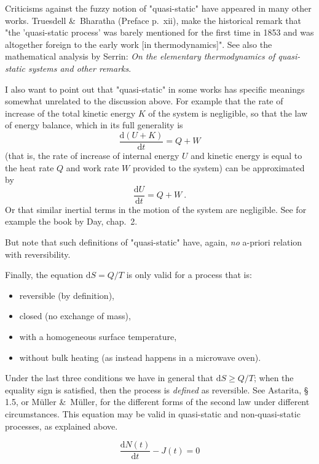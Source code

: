 \documentclass[a4paper,12pt,%
onecolumn,oneside,titlepage,%
british%
]{memoir}
\newcommand*{\amp}{\&}
\newcommand*{\di}{\mathrm{d}}%
\renewcommand*{\|}[1][]{\nonscript\:#1\vert\nonscript\:\mathopen{}}
\newcommand*{\sect}{\S}%
\newcommand*{\yN}{N}
\newcommand*{\yJ}{J}
\begin{document}
Criticisms against the fuzzy notion of "quasi-static" have appeared in many other works. Truesdell \amp\ Bharatha (Preface p.~xii), make the historical remark that "the 'quasi-static process' was barely mentioned for the first time in 1853 and was altogether foreign to the early work [in thermodynamics]". See also the mathematical analysis by Serrin: \emph{On the elementary thermodynamics of quasi-static systems and other remarks}.

\medskip

I also want to point out that "quasi-static" in some works has specific meanings somewhat unrelated to the discussion above. For example that the rate of increase of the total kinetic energy $K$ of the system is negligible, so that the law of energy balance, which in its full generality is
$$ \frac{\mathrm{d}(U+K)}{\mathrm{d}t}  = Q + W$$
(that is, the rate of increase of internal energy $U$ and kinetic energy is equal to the heat rate $Q$ and work rate $W$ provided to the system) can be approximated by
$$ \frac{\mathrm{d}U}{\mathrm{d}t}  = Q + W \ .$$
Or that similar inertial terms in the motion of the system are negligible. See for example the book by Day, chap.~2.

But note that such definitions of "quasi-static" have, again, \emph{no} a-priori relation with reversibility.

\medskip

Finally, the equation $\mathrm{d}S = Q/T$ is only valid for a process that is:
\begin{itemize}
\item reversible (by definition),
\item closed (no exchange of mass),
\item with a homogeneous surface temperature,
\item without bulk heating (as instead happens in a microwave oven).
\end{itemize}
Under the last three conditions we have in general that $\mathrm{d}S \ge Q/T$; when the equality sign is satisfied, then the process is \emph{defined} as reversible. See Astarita, \sect\,1.5, or M{\"u}ller \amp\ M{\"u}ller, for the different forms of the second law under different circumstances. This equation may be valid in quasi-static and non-quasi-static processes, as explained above.



\begin{equation*}
      \frac{\di\yN(t)}{\di t}- \yJ(t) = 0
\end{equation*}
\end{document}
